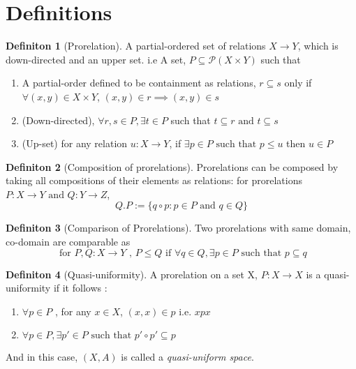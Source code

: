 \documentclass[18pt,a4paper]{article}
\theoremstyle{definition}
\newtheorem{definition}{Definiton}[section]
\begin{document}
\section{Definitions}%
\label{sec:definitions}

\begin{definition}[Prorelation] %
A partial-ordered set of relations $X \to Y$, which is down-directed and an upper set. i.e
A set, $P \subseteq \mathcal{P}(X \times Y)$ such that
	\begin{enumerate}[label=(\roman*)]
		\item A partial-order defined to be containment as relations, $r \subseteq s$
			only if $\forall (x,y) \in X \times Y$, $(x,y) \in r \implies (x,y)\in s$
		\item (Down-directed), $\forall r,s \in P, \exists t \in P $ such that
			$t\subseteq r \text{ and } t \subseteq s$
		\item (Up-set) for any relation $u:X\to Y$, if $\exists p \in P \text{ such that } p\leq u $
			then $u \in P$
\end{enumerate} \end{definition} %
\begin{definition}[Composition of prorelations] %
	Prorelations can be composed by taking all compositions of their elements as relations:
	for prorelations $P:X\to Y \text{ and } Q:Y\to Z$,
	\[ Q.P:=\{q \circ p : p \in P \text{ and } q \in Q  \} \]
\end{definition}
\begin{definition}[Comparison of Prorelations] %
Two prorelations with same domain, co-domain are comparable as
\[ \text{ for }  P,Q:X \to Y \text{ , } P \leq Q \text{ if } \forall q \in Q, \exists p \in P
\text{ such that } p \subseteq q    \]
\end{definition}
\begin{definition}[Quasi-uniformity] %
A prorelation on a set X, $P:X \to X$ is a quasi-uniformity if it follows :
\begin{enumerate}[label=\roman*]
	\item $\forall p \in P $ , for any $x \in X$, $(x,x) \in p$ i.e. $xpx$
	\item $\forall p \in P, \exists p' \in P \text{ such that } p' \circ p' \subseteq p$
\end{enumerate}
And in this case, $(X,A)$ is called a \textit{quasi-uniform space}.
\end{definition}
\end{document}
